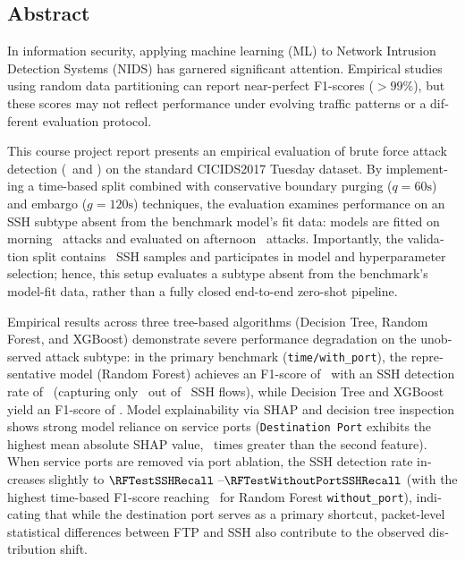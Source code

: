 
\begin{otherlanguage}{english}
\chapter*{Abstract}

In information security, applying machine learning (ML) to Network Intrusion Detection Systems (NIDS) has garnered significant attention. Empirical studies using random data partitioning can report near-perfect F1-scores ($> 99\%$), but these scores may not reflect performance under evolving traffic patterns or a different evaluation protocol.

This course project report presents an empirical evaluation of brute force attack detection (\FTP\ and \SSH) on the standard CICIDS2017 Tuesday dataset. By implementing a time-based split combined with conservative boundary purging ($q=60\text{s}$) and embargo ($g=120\text{s}$) techniques, the evaluation examines performance on an SSH subtype absent from the benchmark model's fit data: models are fitted on morning \FTP\ attacks and evaluated on afternoon \SSH\ attacks. Importantly, the validation split contains \DataValidationSSH\ SSH samples and participates in model and hyperparameter selection; hence, this setup evaluates a subtype absent from the benchmark's model-fit data, rather than a fully closed end-to-end zero-shot pipeline.

Empirical results across three tree-based algorithms (Decision Tree, Random Forest, and XGBoost) demonstrate severe performance degradation on the unobserved attack subtype: in the primary benchmark (\texttt{time/with\_port}), the representative model (Random Forest) achieves an F1-score of \RFTestFOne\ with an SSH detection rate of \RFTestSSHRecall\ (capturing only \RFTestTP\ out of \DataTestSSH\ SSH flows), while Decision Tree and XGBoost yield an F1-score of \DTTestFOne. Model explainability via SHAP and decision tree inspection shows strong model reliance on service ports (\texttt{Destination Port} exhibits the highest mean absolute SHAP value, \SHAPRatioTopOneTwo\ times greater than the second feature). When service ports are removed via port ablation, the SSH detection rate increases slightly to $\RFTestSSHRecall\ \text{--} \RFTestWithoutPortSSHRecall$ (with the highest time-based F1-score reaching \RFTestWithoutPortFOne\ for Random Forest \texttt{without\_port}), indicating that while the destination port serves as a primary shortcut, packet-level statistical differences between FTP and SSH also contribute to the observed distribution shift.


\end{otherlanguage}
